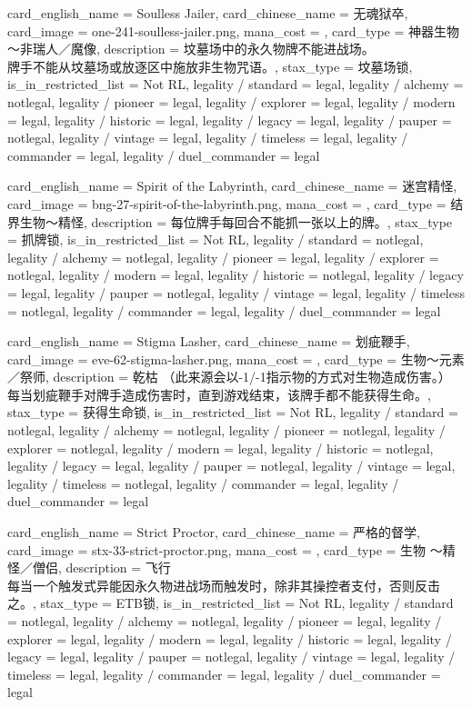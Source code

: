 \documentclass[lang = cn, color = black, 10pt]{AllThatStax}
\begin{document}
\card
{
	card_english_name = {Soulless Jailer},
	card_chinese_name = {无魂狱卒},
	card_image = one-241-soulless-jailer.png,
	mana_cost = ,
	card_type = 神器生物 ～非瑞人／魔像,
	description = {坟墓场中的永久物牌不能进战场。\\
		牌手不能从坟墓场或放逐区中施放非生物咒语。},
	stax_type = 坟墓场锁,
	is_in_restricted_list = Not RL,
	legality / standard = legal,
	legality / alchemy = notlegal,
	legality / pioneer = legal,
	legality / explorer = legal,
	legality / modern = legal,
	legality / historic = legal,
	legality / legacy = legal,
	legality / pauper = notlegal,
	legality / vintage = legal,
	legality / timeless = legal,
	legality / commander = legal,
	legality / duel_commander = legal
}

\card
{
	card_english_name = {Spirit of the Labyrinth},
	card_chinese_name = {迷宫精怪},
	card_image = bng-27-spirit-of-the-labyrinth.png,
	mana_cost = ,
	card_type = 结界生物～精怪,
	description = {每位牌手每回合不能抓一张以上的牌。},
	stax_type = 抓牌锁,
	is_in_restricted_list = Not RL,
	legality / standard = notlegal,
	legality / alchemy = notlegal,
	legality / pioneer = legal,
	legality / explorer = notlegal,
	legality / modern = legal,
	legality / historic = notlegal,
	legality / legacy = legal,
	legality / pauper = notlegal,
	legality / vintage = legal,
	legality / timeless = notlegal,
	legality / commander = legal,
	legality / duel_commander = legal
}

\card
{
	card_english_name = {Stigma Lasher},
	card_chinese_name = {划疵鞭手},
	card_image = eve-62-stigma-lasher.png,
	mana_cost = ,
	card_type = 生物～元素／祭师,
	description = {乾枯 （此来源会以-1/-1指示物的方式对生物造成伤害。）\\
		每当划疵鞭手对牌手造成伤害时，直到游戏结束，该牌手都不能获得生命。},
	stax_type = 获得生命锁,
	is_in_restricted_list = Not RL,
	legality / standard = notlegal,
	legality / alchemy = notlegal,
	legality / pioneer = notlegal,
	legality / explorer = notlegal,
	legality / modern = legal,
	legality / historic = notlegal,
	legality / legacy = legal,
	legality / pauper = notlegal,
	legality / vintage = legal,
	legality / timeless = notlegal,
	legality / commander = legal,
	legality / duel_commander = legal
}

\card
{
	card_english_name = {Strict Proctor},
	card_chinese_name = {严格的督学},
	card_image = stx-33-strict-proctor.png,
	mana_cost = ,
	card_type = 生物 ～精怪／僧侣,
	description = {飞行\\
		每当一个触发式异能因永久物进战场而触发时，除非其操控者支付，否则反击之。},
	stax_type = ETB锁,
	is_in_restricted_list = Not RL,
	legality / standard = notlegal,
	legality / alchemy = notlegal,
	legality / pioneer = legal,
	legality / explorer = legal,
	legality / modern = legal,
	legality / historic = legal,
	legality / legacy = legal,
	legality / pauper = notlegal,
	legality / vintage = legal,
	legality / timeless = legal,
	legality / commander = legal,
	legality / duel_commander = legal
}
\end{document}
